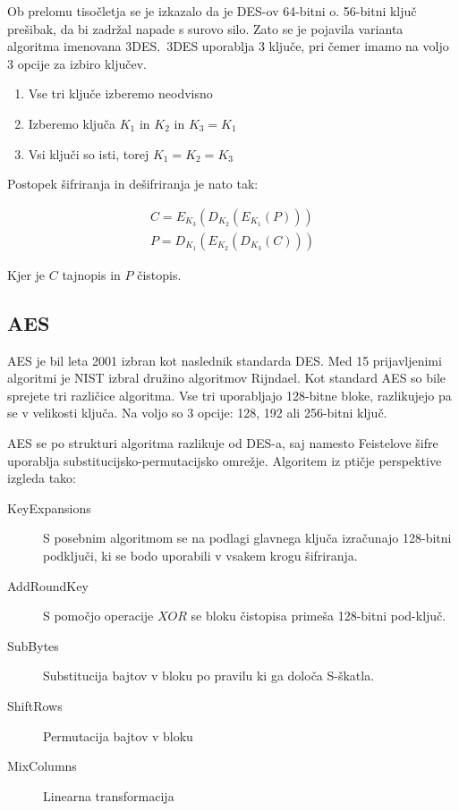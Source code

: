 \documentclass[12pt,a4paper,openany]{book}
\begin{document}
Ob prelomu tisočletja se je izkazalo da je \gls{DES}-ov 64-bitni o. 56-bitni ključ prešibak, da bi zadržal napade s surovo silo. Zato se je pojavila varianta algoritma imenovana 3DES.\ 3DES uporablja 3 ključe, pri čemer imamo na voljo 3 opcije za izbiro ključev.

\begin{enumerate}
\item Vse tri ključe izberemo neodvisno
\item Izberemo ključa $K_1$ in $K_2$ in $K_3=K_1$
\item Vsi ključi so isti, torej $K_1=K_2=K_3$
\end{enumerate}

Postopek šifriranja in dešifriranja je nato tak:

\begin{gather*}
C=E_{K_3}(D_{K_2}(E_{K_1}(P))) \\
P=D_{K_1}(E_{K_2}(D_{K_3}(C)))
\end{gather*}

Kjer je $C$ tajnopis in $P$ čistopis.



\subsection{AES}

\gls{AES} je bil leta 2001 izbran kot naslednik standarda \gls{DES}. Med 15 prijavljenimi algoritmi je \gls{NIST} izbral družino algoritmov Rijndael. Kot standard \gls{AES} so bile sprejete tri različice algoritma. Vse tri uporabljajo 128-bitne bloke, razlikujejo pa se v velikosti ključa. Na voljo so 3 opcije: 128, 192 ali 256-bitni ključ.

\gls{AES} se po strukturi algoritma razlikuje od \gls{DES}-a, saj namesto Feistelove šifre uporablja substitucijsko-permutacijsko omrežje.  Algoritem iz ptičje perspektive izgleda tako:

\begin{description}
	\item[KeyExpansions] S posebnim algoritmom se na podlagi glavnega ključa izračunajo 128-bitni podključi, ki se bodo uporabili v vsakem krogu šifriranja.
	\item[AddRoundKey]  S pomočjo operacije $XOR$ se bloku čistopisa primeša 128-bitni pod-ključ.
	\item[SubBytes] Substitucija bajtov v bloku po pravilu ki ga določa S-škatla.
	\item[ShiftRows] Permutacija bajtov v bloku
	\item[MixColumns] Linearna transformacija
\end{description}
\end{document}
